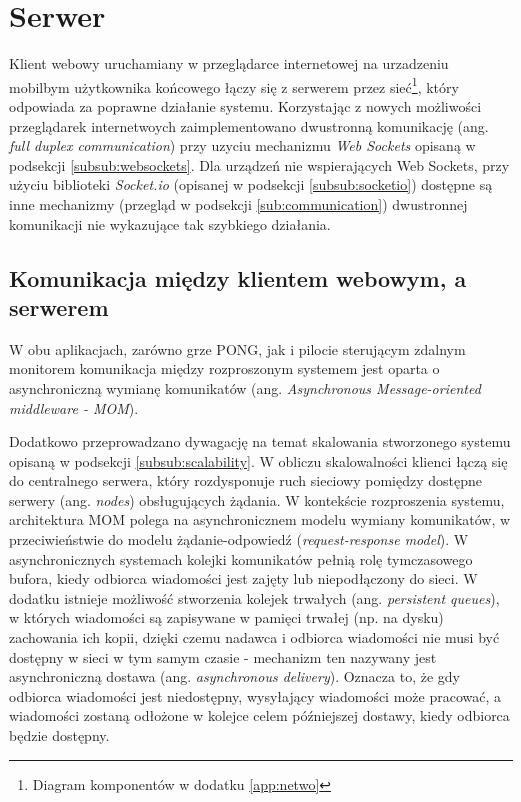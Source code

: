 \section{Serwer}

Klient webowy uruchamiany w przeglądarce internetowej na urzadzeniu mobilbym użytkownika końcowego łączy się z serwerem przez sieć\footnote{Diagram komponentów w dodatku \ref{app:netwo}}, który odpowiada za poprawne działanie systemu. Korzystając z nowych możliwości przeglądarek internetwoych zaimplementowano dwustronną komunikację (ang. \emph{full duplex communication}) przy uzyciu mechanizmu \emph{Web Sockets}\cite{websockets-rfc} opisaną w podsekcji \ref{subsub:websockets}. Dla urządzeń nie wspierających Web Sockets, przy użyciu biblioteki \emph{Socket.io} (opisanej w podsekcji \ref{subsub:socketio}) dostępne są inne mechanizmy (przegląd w podsekcji \ref{sub:communication}) dwustronnej komunikacji nie wykazujące tak szybkiego działania.

\subsection{Komunikacja między klientem webowym, a serwerem}
\label{sub:communication-methods}

W obu aplikacjach, zarówno grze PONG, jak i pilocie sterującym zdalnym monitorem komunikacja między rozproszonym systemem jest oparta o asynchroniczną wymianę komunikatów (ang. \emph{Asynchronous Message-oriented middleware - MOM})\cite{message-oriented-middleware}.

Dodatkowo przeprowadzano dywagację na temat skalowania stworzonego systemu opisaną w podsekcji \ref{subsub:scalability}. W obliczu skalowalności klienci łączą się do centralnego serwera, który rozdysponuje ruch sieciowy pomiędzy dostępne serwery (ang. \emph{nodes}) obsługujących żądania. W kontekście rozproszenia systemu, architektura MOM polega na asynchronicznem modelu wymiany komunikatów, w przeciwieństwie do modelu żądanie-odpowiedź (\emph{request-response model}). W asynchronicznych systemach kolejki komunikatów pełnią rolę tymczasowego bufora, kiedy odbiorca wiadomości jest zajęty lub niepodłączony do sieci. W dodatku istnieje możliwość stworzenia kolejek trwałych (ang. \emph{persistent queues}), w których wiadomości są zapisywane w pamięci trwałej (np. na dysku) zachowania ich kopii, dzięki czemu nadawca i odbiorca wiadomości nie musi być dostępny w sieci w tym samym czasie - mechanizm ten nazywany jest asynchroniczną dostawa (ang. \emph{asynchronous delivery}). Oznacza to, że gdy odbiorca wiadomości jest niedostępny, wysyłający wiadomości może pracować, a wiadomości zostaną odłożone w kolejce celem późniejszej dostawy, kiedy odbiorca będzie dostępny.


